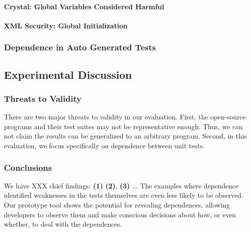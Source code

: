 \paragraph{Crystal: Global Variables Considered Harmful}


\paragraph{XML Security: Global Initialization}




\subsubsection{Dependence in Auto Generated Tests}
\label{sec:autogen}



\subsection{Experimental Discussion}

\subsubsection{Threats to Validity}

There are two major threats to validity in our evaluation.
First, the  open-source
programs and their test suites may not be
representative enough. Thus, we can not claim the results
can be generalized to an arbitrary program.
Second, in this evaluation, we focus specifically on
dependence between unit tests.

\subsubsection{Conclusions}


We have XXX chief findings: \textbf{(1)}
\textbf{(2)}, \textbf{(3)} ...
The examples where dependence identified weaknesses in the tests themselves
are even less likely to be observed.  
Our prototype tool shows
the potential for revealing dependences, allowing
developers to observe them and make conscious decisions about how, or even whether,
to deal with the dependences. 
